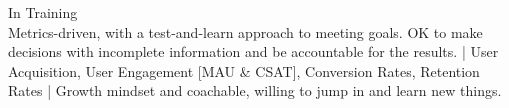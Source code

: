 In Training \\
{\scriptsize
Metrics-driven, with a test-and-learn approach to meeting goals. OK to make decisions with incomplete information and be accountable for the results.
|
User Acquisition,
User Engagement [MAU \& CSAT],
Conversion Rates,
Retention Rates
|
Growth mindset and coachable, willing to jump in and learn new things.
}

